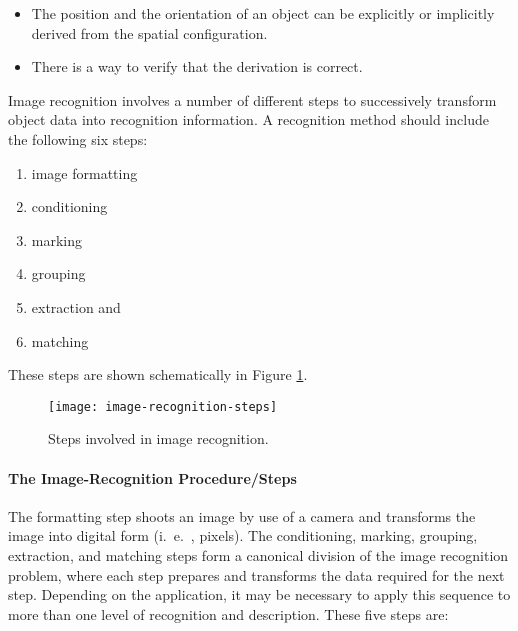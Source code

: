 \begin{itemize}
	\item The position and the orientation of an object can be explicitly or implicitly derived from the spatial configuration.
	\item There is a way to verify that the derivation is correct.
\end{itemize}

Image recognition involves a number of different steps to successively transform object data into recognition information. A recognition method should include the following six steps:

\begin{multicols}{3}
\begin{enumerate}
	\item image formatting
	\item conditioning
	\item marking
	\item grouping
	\item extraction and 
	\item matching
\end{enumerate} 
\end{multicols}

These steps are shown schematically in Figure {\ref{fig:image-recognition-steps}}.

\begin{figure}[h]
	\centering
	\texttt{[image: image-recognition-steps]}
	\caption{Steps involved in image recognition.}{\label{fig:image-recognition-steps}}
\end{figure}

\paragraph*{The Image-Recognition Procedure/Steps}

The formatting step shoots an image by use of a camera and transforms the image into digital form (i.\ e.\ , pixels). The conditioning, marking, grouping,
extraction, and matching steps form a canonical division of the image recognition problem, where each step prepares and transforms the data required for the next step.
Depending on the application, it may be necessary to apply this sequence to more than one level of recognition and description. These five steps are:

